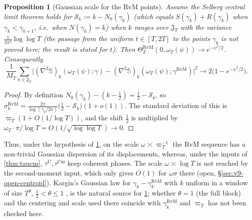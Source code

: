 \documentclass[11pt,a4paper]{article}
\numberwithin{equation}{section}
\newtheorem{proposition}[theorem]{Proposition}
\theoremstyle{definition}
\theoremstyle{remark}
\newcommand{\Cm}{\mathrm{Cm}}
\begin{document}
\begin{proposition}[Gaussian scale for the RvM points]\label{prop:v9-gauss}
Assume the Selberg central limit theorem holds for $\mathcal S_k:=k-N_0(\gamma_k)$ (which equals $S(\gamma_k)+R(\gamma_k)$ when $\gamma_k<\gamma_{k+1}$, i.e.\ when $N(\gamma_k)=k$) when $k$ ranges over $\mathfrak J_T$ with the variance $\frac1{2\pi^2}\log\log T$ (the passage from the uniform $t\in[T,2T]$ to the points $\gamma_k$ is \emph{not proved} here; the result \cite{Selberg1946} is stated for $t$). Then $\Theta_T^{\mathrm{RvM}}(0,\omega_T(\psi))\to e^{-\psi^2/2}$. Consequently
\begin{equation}
\frac1{M_T}\sum_{k\in\mathfrak J_T}\bigl|(\nabla^2\mathbb S)_k(\omega_T(\psi);\gamma)-(\nabla^2\mathbb S)_k(\omega_T(\psi);\gamma^{\mathrm{RvM}})\bigr|^2\to2\bigl(1-e^{-\psi^2/2}\bigr).
\end{equation}
\end{proposition}
\begin{proof}
By definition $N_0(\gamma_k)-(k-\frac12)=\frac12-\mathcal S_k$, so $\sigma_k^{\mathrm{RvM}}=\frac{2\pi}{\log(\gamma_k/2\pi)}\bigl(\frac12-\mathcal S_k\bigr)(1+o(1))$. The standard deviation of this is $\varpi_T(1+O(1/\log T))$, and the shift $\frac12$ is multiplied by $\omega_T\cdot\pi/\log T=O(1/\sqrt{\log\log T})\to0$.
\end{proof}
Thus, under the hypothesis of \cref{prop:v9-gauss}, on the scale $\omega\asymp\varpi_T^{-1}$ the RvM sequence has a non-trivial Gaussian dispersion of its displacements, whereas, under the inputs of \cref{thm:taucm}, $\tau^{\mathrm C},\tau^{\Cm}$ keep coherent phases. The scale $\omega\asymp\log T$ is not reached by the second-moment input, which only gives $O(1)$ for $\omega\sigma$ there (open, \S\ref{sec:v9-open-centroid}). Kargin's Gaussian law for $\gamma_k-\gamma_k^{\mathrm{RvM}}$ with $k$ uniform in a window of size $T^{\theta}$, $\frac12<\theta\le1$ \cite{Kargin2013}, is the natural source for \cref{prop:v9-gauss}; whether $\theta=1$ (the full block) and the centering and scale used there coincide with $\gamma_k^{\mathrm{RvM}}$ and $\varpi_T$ has not been checked here.
\end{document}
